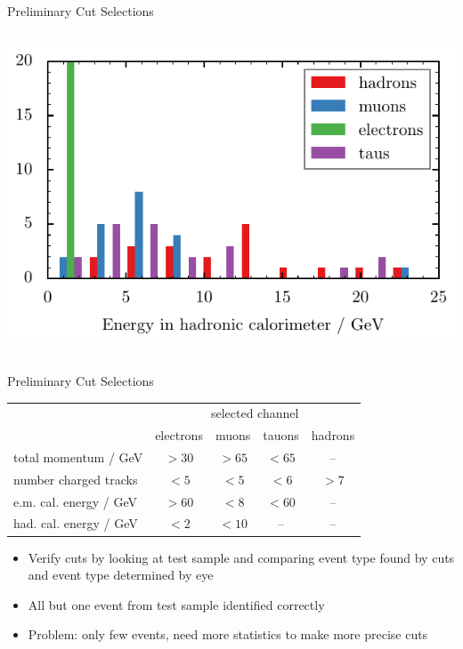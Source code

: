 \documentclass[11pt,xcolor=dvipsnames,professionalfonts]{beamer}
\begin{document}
\begin{frame}{Preliminary Cut Selections}
\begin{columns}
		\includegraphics[width=1.0\textwidth]{./talkfigs/pdf/Hcal(SumE).pdf}
	\end{columns}
\end{frame}

\begin{frame}{Preliminary Cut Selections}
	\begin{center}
		\begin{tabular}{lcccc}
			\toprule
			&\multicolumn{4}{c}{selected channel}  \\ \cmidrule(r){2-5}
			& electrons & muons & tauons & hadrons \\
			\midrule
			total momentum / \si{GeV} & $> 30$ & $> 65$ & $< 65$ & --\\
			number charged tracks & $< 5$  & $< 5$  & $< 6$ & $>7$ \\
			e.m. cal. energy / \si{GeV}  & $> 60$ & $< 8$ & $< 60$ & -- \\
			had. cal. energy / \si{GeV}  & $< 2$  & $< 10$ & -- & -- \\
			\bottomrule
		\end{tabular}
	\end{center}
	\begin{itemize}
		\item Verify cuts by looking at test sample and comparing event type found by cuts and event type determined by eye
		\item All but one event from test sample identified correctly
		\item Problem: only few events, need more statistics to make more precise cuts
	\end{itemize}
\end{frame}
\end{document}
